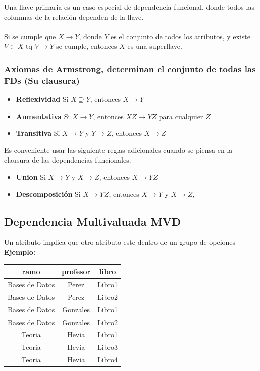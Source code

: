\documentclass[11pt,letterpaper]{article}
\begin{document}
Una llave primaria es un caso especial de dependencia funcional, donde todos las columnas de la relación dependen de la llave.
\\\\
Si se cumple que $X\rightarrow Y$, donde $Y$ es el conjunto de todos los atributos, y existe $V\subset X$ tq $V\rightarrow Y$ se cumple, entonces $X$ es una superllave.
\newpage
\subsubsection{Axiomas de Armstrong, determinan el conjunto de todas las FDs (Su clausura)}
\begin{itemize}
	\item \textbf{Reflexividad} Si $X\supseteq Y$, entonces $X\rightarrow Y$ 
	\item \textbf{Aumentativa} Si $X\rightarrow Y$, entonces $XZ\rightarrow YZ$ para cualquier $Z$
	\item \textbf{Transitiva} Si $X\rightarrow Y$ y $Y\rightarrow Z$, entonces $X\rightarrow Z$ 
\end{itemize}

Es conveniente usar las siguiente reglas adicionales cuando se piensa en la clausura de las dependencias funcionales.
\begin{itemize}
	\item \textbf{Union} Si $X\rightarrow Y$ y $X \rightarrow Z$, entonces $X \rightarrow YZ$
	\item \textbf{Descomposición} Si $X\rightarrow YZ$, entonces $X\rightarrow Y$ y $X \rightarrow Z$,
\end{itemize}

\subsection{Dependencia Multivaluada MVD}
Un atributo implica que otro atributo este dentro de un grupo de opciones \\
\textbf{Ejemplo:}

\begin{table}[h!]
	\center
	\begin{tabular}{|c|c|c|}
	\hline
	 ramo &  profesor &  libro \\ \hline\hline
	 Bases de Datos & Perez 		& Libro1 \\ \hline
	 Bases de Datos & Perez 		& Libro2 \\ \hline
	 Bases de Datos & Gonzales 	& Libro1 \\ \hline
	 Bases de Datos & Gonzales 	& Libro2 \\ \hline
	 Teoria 		& Hevia 		& Libro1 \\ \hline
	 Teoria 		& Hevia 		& Libro3 \\ \hline
	 Teoria 		& Hevia 		& Libro4 \\ \hline
	\end{tabular}
\end{table}
\end{document}
